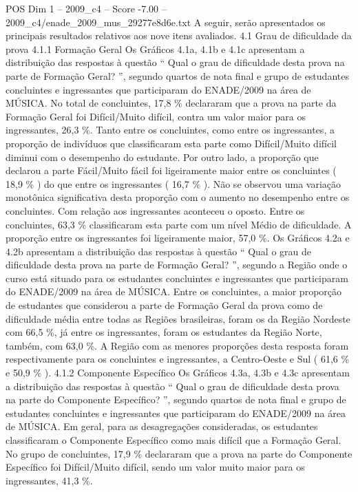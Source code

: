 \begin{textsample}{POS Dim 1 – 2009\_c4 – Score -7.00 – 2009\_c4/enade\_2009\_mus\_29277e8d6e.txt}
A seguir, serão apresentados os principais resultados relativos aos nove itens avaliados. 4.1 Grau de dificuldade da prova 4.1.1 Formação Geral Os Gráficos 4.1a, 4.1b e 4.1c apresentam a distribuição das respostas à questão “ Qual o grau de dificuldade desta prova na parte de Formação Geral? ”, segundo quartos de nota final e grupo de estudantes concluintes e ingressantes que participaram do ENADE/2009 na área de MÚSICA.
No total de concluintes, 17,8 \% declararam que a prova na parte da Formação Geral foi Difícil/Muito difícil, contra um valor maior para os ingressantes, 26,3 \%.
Tanto entre os concluintes, como entre os ingressantes, a proporção de indivíduos que classificaram esta parte como Difícil/Muito difícil diminui com o desempenho do estudante.
Por outro lado, a proporção que declarou a parte Fácil/Muito fácil foi ligeiramente maior entre os concluintes ( 18,9 \% ) do que entre os ingressantes ( 16,7 \% ).
Não se observou uma variação monotônica significativa desta proporção com o aumento no desempenho entre os concluintes.
Com relação aos ingressantes aconteceu o oposto.
Entre os concluintes, 63,3 \% classificaram esta parte com um nível Médio de dificuldade.
A proporção entre os ingressantes foi ligeiramente maior, 57,0 \%.
Os Gráficos 4.2a e 4.2b apresentam a distribuição das respostas à questão “ Qual o grau de dificuldade desta prova na parte de Formação Geral? ”, segundo a Região onde o curso está situado para os estudantes concluintes e ingressantes que participaram do ENADE/2009 na área de MÚSICA.
Entre os concluintes, a maior proporção de estudantes que considerou a parte de Formação Geral da prova como de dificuldade média entre todas as Regiões brasileiras, foram os da Região Nordeste com 66,5 \%, já entre os ingressantes, foram os estudantes da Região Norte, também, com 63,0 \%.
A Região com as menores proporções desta resposta foram respectivamente para os concluintes e ingressantes, a Centro-Oeste e Sul ( 61,6 \% e 50,9 \% ). 4.1.2 Componente Específico Os Gráficos 4.3a, 4.3b e 4.3c apresentam a distribuição das respostas à questão “ Qual o grau de dificuldade desta prova na parte do Componente Específico? ”, segundo quartos de nota final e grupo de estudantes concluintes e ingressantes que participaram do ENADE/2009 na área de MÚSICA.
Em geral, para as desagregações consideradas, os estudantes classificaram o Componente Específico como mais difícil que a Formação Geral.
No grupo de concluintes, 17,9 \% declararam que a prova na parte do Componente Específico foi Difícil/Muito difícil, sendo um valor muito maior para os ingressantes, 41,3 \%.

\end{textsample}

